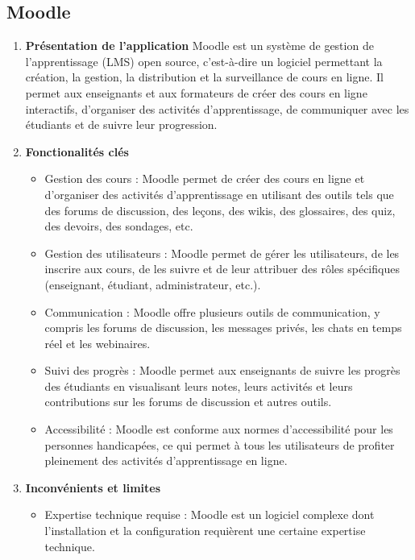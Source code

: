 \subsection{Moodle}\label{subsec:moodle}
\begin{enumerate}
    \item \textbf{Présentation de l'application} \newline Moodle est un système de gestion de l'apprentissage (LMS) open source, c'est-à-dire un logiciel permettant la création, la gestion, la distribution et la surveillance de cours en ligne. Il permet aux enseignants et aux formateurs de créer des cours en ligne interactifs, d'organiser des activités d'apprentissage, de communiquer avec les étudiants et de suivre leur progression.
    \item \textbf{Fonctionalités clés}
        \begin{itemize}
            \item Gestion des cours : Moodle permet de créer des cours en ligne et d'organiser des activités d'apprentissage en utilisant des outils tels que des forums de discussion, des leçons, des wikis, des glossaires, des quiz, des devoirs, des sondages, etc.
            \item Gestion des utilisateurs : Moodle permet de gérer les utilisateurs, de les inscrire aux cours, de les suivre et de leur attribuer des rôles spécifiques (enseignant, étudiant, administrateur, etc.).
            \item Communication : Moodle offre plusieurs outils de communication, y compris les forums de discussion, les messages privés, les chats en temps réel et les webinaires.
            \item Suivi des progrès : Moodle permet aux enseignants de suivre les progrès des étudiants en visualisant leurs notes, leurs activités et leurs contributions sur les forums de discussion et autres outils.
            \item Accessibilité : Moodle est conforme aux normes d'accessibilité pour les personnes handicapées, ce qui permet à tous les utilisateurs de profiter pleinement des activités d'apprentissage en ligne.
        \end{itemize}
    \item \textbf{Inconvénients et limites}
        \begin{itemize}
            \item Expertise technique requise : Moodle est un logiciel complexe dont l'installation et la configuration requièrent une certaine expertise technique.

\end{itemize}
\end{enumerate}
